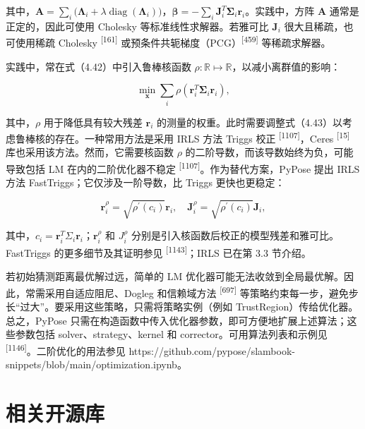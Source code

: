 其中，$\pmb{A} = \sum_i \bigl(\pmb{\Lambda}_i + \lambda \operatorname{diag}(\pmb{\Lambda}_i)\bigr)$，$\pmb{\beta} = -\sum_i \pmb{J}_i^T\pmb{\Sigma}_i\pmb{r}_i$。实践中，方阵 $\pmb{A}$ 通常是正定的，因此可使用 Cholesky 等标准线性求解器。若雅可比 $\pmb{J}_i$ 很大且稀疏，也可使用稀疏 Cholesky \textsuperscript{[161]} 或预条件共轭梯度（PCG）\textsuperscript{[459]} 等稀疏求解器。

实践中，常在式（4.42）中引入鲁棒核函数 $\rho : \mathbb { R } \mapsto \mathbb { R }$，以减小离群值的影响：

\begin{equation}
\min _ {\boldsymbol {x}} \sum_ {i} \rho \left(\boldsymbol {r} _ {i} ^ {T} \boldsymbol {\Sigma} _ {i} \boldsymbol {r} _ {i}\right),\tag{4.45}
\end{equation}

其中，$\rho$ 用于降低具有较大残差 $\pmb{r}_i$ 的测量的权重。此时需要调整式（4.43）以考虑鲁棒核的存在。一种常用方法是采用 IRLS 方法 Triggs 校正 \textsuperscript{[1107]}，Ceres \textsuperscript{[15]} 库也采用该方法。然而，它需要核函数 $\rho$ 的二阶导数，而该导数始终为负，可能导致包括 LM 在内的二阶优化器不稳定 \textsuperscript{[1107]}。作为替代方案，PyPose 提出 IRLS 方法 FastTriggs；它仅涉及一阶导数，比 Triggs 更快也更稳定：

\begin{equation}
\pmb {r} _ {i} ^ {\rho} = \sqrt {\rho^ {\prime} (c _ {i})} \pmb {r} _ {i}, \quad \pmb {J} _ {i} ^ {\rho} = \sqrt {\rho^ {\prime} (c _ {i})} \pmb {J} _ {i},\tag{4.46}
\end{equation}

其中，$c _ { i } = \boldsymbol { r } _ { i } ^ { T } \Sigma _ { i } \boldsymbol { r } _ { i }$；$\boldsymbol { r } _ { i } ^ { \rho }$ 和 $J _ { i } ^ { \rho }$ 分别是引入核函数后校正的模型残差和雅可比。FastTriggs 的更多细节及其证明参见 \textsuperscript{[1143]}；IRLS 已在第 3.3 节介绍。

若初始猜测距离最优解过远，简单的 LM 优化器可能无法收敛到全局最优解。因此，常需采用自适应阻尼、Dogleg 和信赖域方法 \textsuperscript{[697]} 等策略约束每一步，避免步长“过大”。要采用这些策略，只需将策略实例（例如 TrustRegion）传给优化器。总之，PyPose 只需在构造函数中传入优化器参数，即可方便地扩展上述算法；这些参数包括 solver、strategy、kernel 和 corrector。可用算法列表和示例见 \textsuperscript{[1146]}。二阶优化的用法参见 https://github.com/pypose/slambook-snippets/blob/main/optimization.ipynb。

\section{相关开源库}

